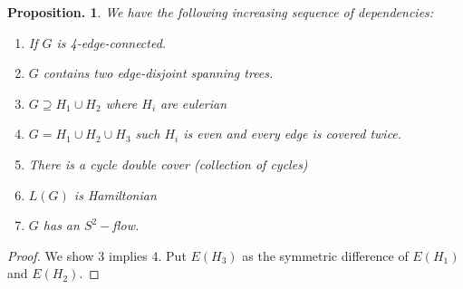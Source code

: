 \documentclass[11pt, a4paper]{memoir}
\theoremstyle{change}
\newtheorem{proposition}[theorem]{Proposition.}
\theoremstyle{plain}
\theoremstyle{nonumberplain}
\newtheorem{proof}{Proof}
\numberwithin{equation}{section}
\begin{document}
\begin{proposition}
    We have the following increasing sequence of dependencies:
    \begin{enumerate}[nl]
        \item If $G$ is 4-edge-connected.
        \item $G$ contains two edge-disjoint spanning trees.
        \item $G\supseteq H_1\cup H_2$ where $H_i$ are eulerian
        \item $G=H_1\cup H_2\cup H_3$ such $H_i$ is even and every edge is covered twice.
        \item There is a cycle double cover (collection of cycles)
        \item $L(G)$ is Hamiltonian
        \item $G$ has an $S^2-$flow.
    \end{enumerate}
\end{proposition}
\begin{proof}
    We show 3 implies 4.
    Put $E(H_3)$ as the symmetric difference of $E(H_1)$ and $E(H_2)$.
\end{proof}
\end{document}
